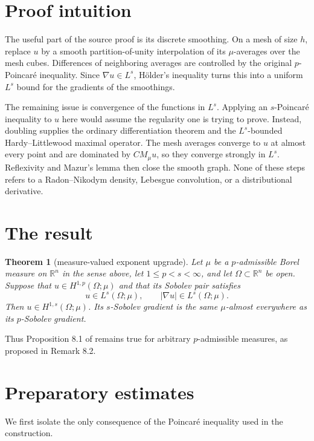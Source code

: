\documentclass[11pt]{article}
\newtheorem{theorem}{Theorem}
\newcommand{\R}{\mathbb R}
\begin{document}
\section{Proof intuition}

The useful part of the source proof is its discrete smoothing.  On a mesh of
size \(h\), replace \(u\) by a smooth partition-of-unity interpolation of its
\(\mu\)-averages over the mesh cubes.  Differences of neighboring averages
are controlled by the original \(p\)-Poincar\'e inequality.  Since
\(\nabla u\in L^s\), H\"older's inequality turns this into a uniform
\(L^s\) bound for the gradients of the smoothings.

The remaining issue is convergence of the functions in \(L^s\).  Applying an
\(s\)-Poincar\'e inequality to \(u\) here would assume the regularity one is
trying to prove.  Instead, doubling supplies the ordinary differentiation
theorem and the \(L^s\)-bounded Hardy--Littlewood maximal operator.  The mesh
averages converge to \(u\) at almost every point and are dominated by
\(C M_\mu u\), so they converge strongly in \(L^s\).  Reflexivity and
Mazur's lemma then close the smooth graph.  None of these steps refers to a
Radon--Nikodym density, Lebesgue convolution, or a distributional derivative.

\section{The result}

\begin{theorem}[measure-valued exponent upgrade]\label{thm:main}
Let \(\mu\) be a \(p\)-admissible Borel measure on \(\R^n\) in the sense
above, let \(1\le p<s<\infty\), and let \(\Omega\subset\R^n\) be open.
Suppose that \(u\in H^{1,p}(\Omega;\mu)\) and that its Sobolev pair satisfies
\[
        u\in L^s(\Omega;\mu),\qquad
        |\nabla u|\in L^s(\Omega;\mu).
\]
Then \(u\in H^{1,s}(\Omega;\mu)\).  Its \(s\)-Sobolev gradient is the same
\(\mu\)-almost everywhere as its \(p\)-Sobolev gradient.
\end{theorem}

Thus Proposition 8.1 of \cite{EM} remains true for arbitrary
\(p\)-admissible measures, as proposed in Remark 8.2.

\section{Preparatory estimates}

We first isolate the only consequence of the Poincar\'e inequality used in
the construction.
\end{document}
